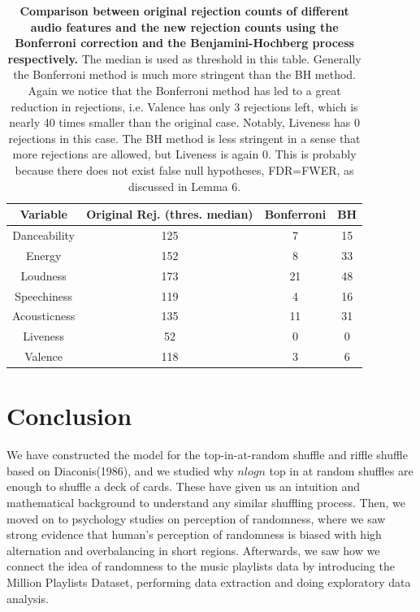 \documentclass[12pt]{article}
\theoremstyle{plain}
\theoremstyle{definition}
\theoremstyle{remark}
\begin{document}
\begin{table}[h!]
    \centering
    \begin{tabular}{|c|c|c|c|}
       \hline
       Variable & Original Rej. (thres. median) & Bonferroni & BH\\
       \hline
        Danceability &125 &7&15\\
        \hline
        Energy & 152&8&33\\
        \hline
        Loudness & 173&21&48\\
        \hline
        Speechiness & 119&4&16\\
        \hline
        Acousticness &135 &11&31\\
        \hline
        Liveness &52 &0&0\\
        \hline
        Valence & 118&3&6\\
        \hline
    \end{tabular}
    \caption{\textbf{Comparison between original rejection counts of different audio features and the new rejection counts using the Bonferroni correction and the Benjamini-Hochberg process respectively.} The median is used as threshold in this table. Generally the Bonferroni method is much more stringent than the BH method. Again we notice that the Bonferroni method has led to a great reduction in rejections, i.e. Valence has only 3 rejections left, which is nearly 40 times smaller than the original case. Notably, Liveness has 0 rejections in this case. The BH method is less stringent in a sense that more rejections are allowed, but Liveness is again 0. This is probably because there does not exist false null hypotheses, FDR=FWER, as discussed in Lemma 6. }
    \label{table 6}
\end{table}
\clearpage


\section{Conclusion}
We have constructed the model for the top-in-at-random shuffle and riffle shuffle based on Diaconis(1986), and we studied why $nlogn$ top in at random shuffles are enough to shuffle a deck of cards. These have given us an intuition and mathematical background to understand any similar shuffling process. Then, we moved on to psychology studies on perception of randomness, where we saw strong evidence that human's perception of randomness is biased with high alternation and overbalancing in short regions. Afterwards, we saw how we connect the idea of randomness to the music playlists data by introducing the Million Playlists Dataset, performing data extraction and doing exploratory data analysis. 
\end{document}
